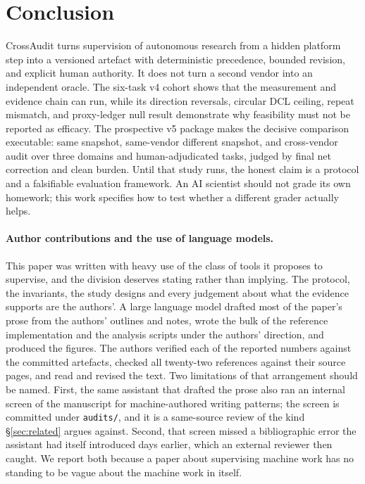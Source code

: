 \documentclass[11pt,letterpaper]{article}
\begin{document}
\section{Conclusion}\label{sec:conclusion}

CrossAudit turns supervision of autonomous research from a hidden platform step into a versioned artefact with deterministic precedence, bounded revision, and explicit human authority. It does not turn a second vendor into an independent oracle. The six-task v4 cohort shows that the measurement and evidence chain can run, while its direction reversals, circular DCL ceiling, repeat mismatch, and proxy-ledger null result demonstrate why feasibility must not be reported as efficacy. The prospective v5 package makes the decisive comparison executable: same snapshot, same-vendor different snapshot, and cross-vendor audit over three domains and human-adjudicated tasks, judged by final net correction and clean burden. Until that study runs, the honest claim is a protocol and a falsifiable evaluation framework. An AI scientist should not grade its own homework; this work specifies how to test whether a different grader actually helps.

\paragraph{Author contributions and the use of language models.} This paper was written with heavy use of the class of tools it proposes to supervise, and the division deserves stating rather than implying. The protocol, the invariants, the study designs and every judgement about what the evidence supports are the authors'. A large language model drafted most of the paper's prose from the authors' outlines and notes, wrote the bulk of the reference implementation and the analysis scripts under the authors' direction, and produced the figures. The authors verified each of the reported numbers against the committed artefacts, checked all twenty-two references against their source pages, and read and revised the text. Two limitations of that arrangement should be named. First, the same assistant that drafted the prose also ran an internal screen of the manuscript for machine-authored writing patterns; the screen is committed under \texttt{audits/}, and it is a same-source review of the kind \S\ref{sec:related} argues against. Second, that screen missed a bibliographic error the assistant had itself introduced days earlier, which an external reviewer then caught. We report both because a paper about supervising machine work has no standing to be vague about the machine work in itself.
\end{document}
